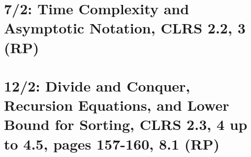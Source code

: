 










\section{7/2: Time Complexity and Asymptotic Notation, CLRS 2.2, 3 (RP)}
\section{12/2: Divide and Conquer, Recursion Equations, and Lower Bound for Sorting, CLRS 2.3, 4 up to 4.5, pages 157-160, 8.1 (RP)}
